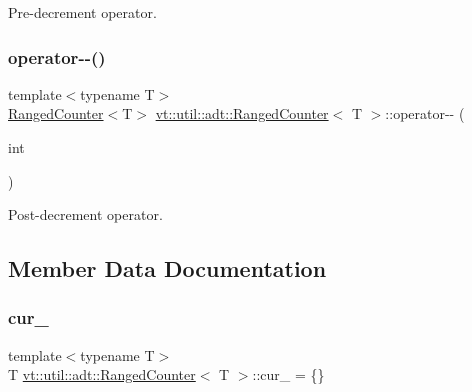 Pre-\/decrement operator. 

\mbox{\label{structvt_1_1util_1_1adt_1_1_ranged_counter_a0e52a234fa27ae0d6a213cdf3a4dbb4d}} 
\subsubsection{\texorpdfstring{operator-\/-\/()}{operator--()}\hspace{0.1cm}{\footnotesize\ttfamily [2/2]}}
{\footnotesize\ttfamily template$<$typename T$>$ \\
\hyperlink{structvt_1_1util_1_1adt_1_1_ranged_counter}{Ranged\+Counter}$<$T$>$ \hyperlink{structvt_1_1util_1_1adt_1_1_ranged_counter}{vt\+::util\+::adt\+::\+Ranged\+Counter}$<$ T $>$\+::operator-\/-\/ (\begin{DoxyParamCaption}\item[{int}]{ }\end{DoxyParamCaption})\hspace{0.3cm}{\ttfamily [inline]}}



Post-\/decrement operator. 



\subsection{Member Data Documentation}
\mbox{\label{structvt_1_1util_1_1adt_1_1_ranged_counter_a939039fc75a2c589ab72733efe72df84}} 
\subsubsection{\texorpdfstring{cur\+\_\+}{cur\_}}
{\footnotesize\ttfamily template$<$typename T$>$ \\
T \hyperlink{structvt_1_1util_1_1adt_1_1_ranged_counter}{vt\+::util\+::adt\+::\+Ranged\+Counter}$<$ T $>$\+::cur\+\_\+ = \{\}\hspace{0.3cm}{\ttfamily [private]}}

